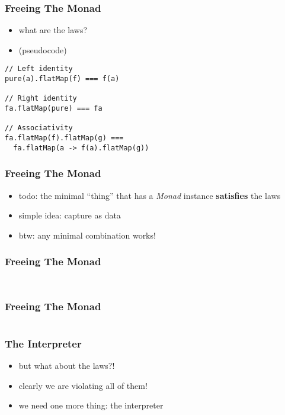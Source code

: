 \documentclass{beamer}
\begin{document}
\begin{frame}[fragile]
  \frametitle{Freeing The Monad}
\begin{itemize}
\item what are the laws?
\item (pseudocode)
\end{itemize}
    \begin{center}
\begin{verbatim}
// Left identity
pure(a).flatMap(f) === f(a)

// Right identity
fa.flatMap(pure) === fa

// Associativity
fa.flatMap(f).flatMap(g) ===
  fa.flatMap(a -> f(a).flatMap(g))
\end{verbatim}
    \end{center}
\end{frame}

\begin{frame}[fragile]
  \frametitle{Freeing The Monad}
  \begin{itemize}
  \item todo: the minimal ``thing'' that has a \textit{Monad} instance
    \textbf{satisfies} the laws
  \item simple idea: capture as data
  \item btw: any minimal combination works!
  \end{itemize}
\end{frame}

\begin{frame}[fragile]
  \frametitle{Freeing The Monad}
  \begin{center}
    \inputminted{scala}{snippets/monad-typeclass.scala}
    \vspace{1cm}
    \inputminted{scala}{snippets/free-monad.scala}
  \end{center}
\end{frame}

\begin{frame}[fragile]
  \frametitle{Freeing The Monad}
  \begin{center}
    \inputminted{scala}{snippets/free-instance.scala}
  \end{center}
\end{frame}

\begin{frame}[fragile]
  \frametitle{The Interpreter}
  \begin{itemize}
  \item but what about the laws?!
  \item clearly we are violating all of them!
  \item we need one more thing: the interpreter
  \end{itemize}
  \inputminted{scala}{snippets/free-interp.scala}
\end{frame}
\end{document}
